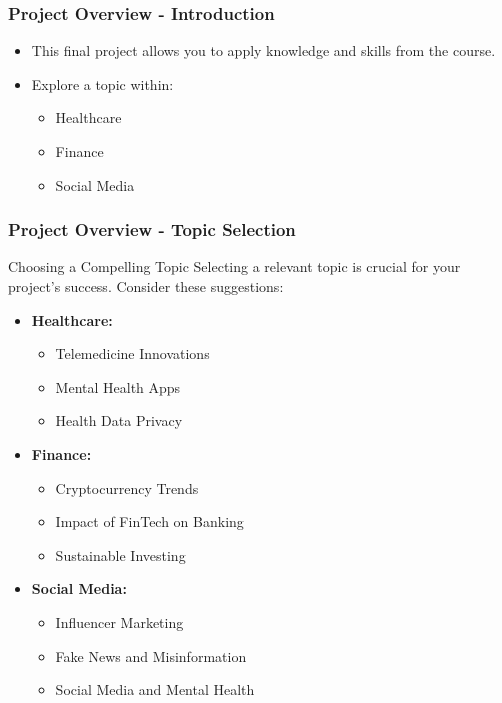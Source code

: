 \documentclass[aspectratio=169]{beamer}
\begin{document}
\begin{frame}[fragile]
    \frametitle{Project Overview - Introduction}
    \begin{itemize}
        \item This final project allows you to apply knowledge and skills from the course.
        \item Explore a topic within:
        \begin{itemize}
            \item Healthcare
            \item Finance
            \item Social Media
        \end{itemize}
    \end{itemize}
\end{frame}

\begin{frame}[fragile]
    \frametitle{Project Overview - Topic Selection}
    \begin{block}{Choosing a Compelling Topic}
        Selecting a relevant topic is crucial for your project’s success. Consider these suggestions:
    \end{block}
    
    \begin{itemize}
        \item \textbf{Healthcare:}
        \begin{itemize}
            \item Telemedicine Innovations
            \item Mental Health Apps
            \item Health Data Privacy
        \end{itemize}
        \item \textbf{Finance:}
        \begin{itemize}
            \item Cryptocurrency Trends
            \item Impact of FinTech on Banking
            \item Sustainable Investing
        \end{itemize}
        \item \textbf{Social Media:}
        \begin{itemize}
            \item Influencer Marketing
            \item Fake News and Misinformation
            \item Social Media and Mental Health
        \end{itemize}
    \end{itemize}
\end{frame}
\end{document}
